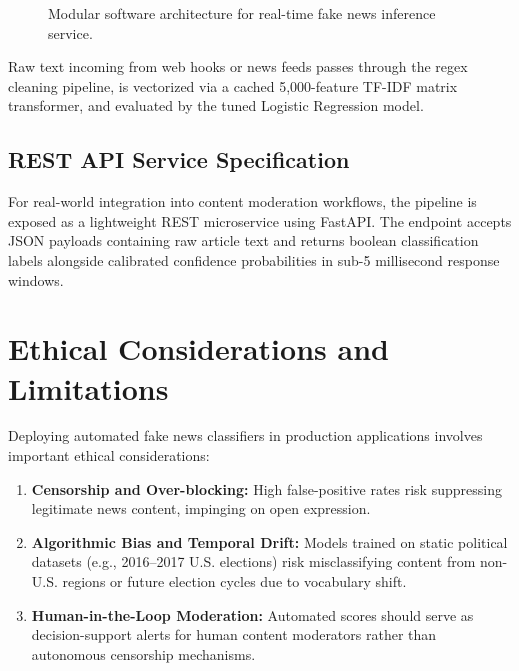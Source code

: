 \documentclass[conference]{IEEEtran}
\begin{document}
\begin{figure}[htbp]
\centering
\begin{center}
\end{center}
\caption{Modular software architecture for real-time fake news inference service.}
\label{fig:arch_diag}
\end{figure}

Raw text incoming from web hooks or news feeds passes through the regex cleaning pipeline, is vectorized via a cached 5,000-feature TF-IDF matrix transformer, and evaluated by the tuned Logistic Regression model.

\subsection{REST API Service Specification}
For real-world integration into content moderation workflows, the pipeline is exposed as a lightweight REST microservice using FastAPI. The endpoint accepts JSON payloads containing raw article text and returns boolean classification labels alongside calibrated confidence probabilities in sub-5 millisecond response windows.

\section{Ethical Considerations and Limitations}

Deploying automated fake news classifiers in production applications involves important ethical considerations:
\begin{enumerate}
    \item \textbf{Censorship and Over-blocking:} High false-positive rates risk suppressing legitimate news content, impinging on open expression.
    \item \textbf{Algorithmic Bias and Temporal Drift:} Models trained on static political datasets (e.g., 2016--2017 U.S. elections) risk misclassifying content from non-U.S. regions or future election cycles due to vocabulary shift.
    \item \textbf{Human-in-the-Loop Moderation:} Automated scores should serve as decision-support alerts for human content moderators rather than autonomous censorship mechanisms.
\end{enumerate}
\end{document}
